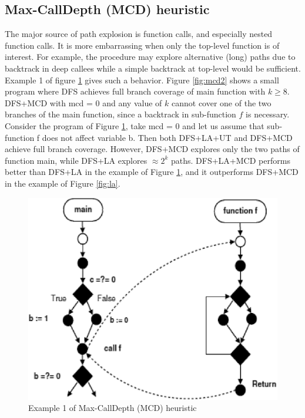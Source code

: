 \subsection{Max-CallDepth (MCD) heuristic}
The major source of path explosion is function calls, and especially nested function calls. It is more embarrassing when only the top-level function is of interest. For example, the procedure may explore alternative (long) paths due to backtrack in deep callees while a simple backtrack at top-level would be sufficient. Example 1 of figure \ref{fig:mcd} gives such a behavior. Figure \ref{fig:mcd2} shows a small program where DFS achieves full branch coverage of main function with $k \geq 8$. DFS+MCD with mcd = 0 and any value of $k$ cannot cover one of the two branches of the main function, since a backtrack in sub-function $f$ is necessary. Consider the program of Figure \ref{fig:mcd}, take mcd = 0 and let us assume that sub-function f does not affect variable b. Then both DFS+LA+UT and DFS+MCD achieve full branch coverage. However, DFS+MCD explores only the two paths of function main, while DFS+LA explores $\approx 2^k$ paths. DFS+LA+MCD performs better
than DFS+LA in the example of Figure \ref{fig:mcd}, and it outperforms DFS+MCD in the example of Figure \ref{fig:la}.

\begin{figure}
\centering
\includegraphics[scale=0.35,clip]{fig/mcd.eps} 
\caption{\label{fig:mcd}Example 1 of Max-CallDepth (MCD) heuristic} 
\end{figure}

